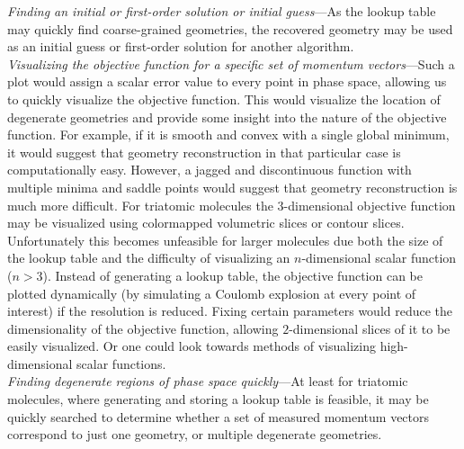 \emph{Finding an initial or first-order solution or initial guess}---As the lookup table may quickly find coarse-grained geometries, the recovered geometry may be used as an initial guess or first-order solution for another algorithm. \\

\noindent
\emph{Visualizing the objective function for a specific set of momentum vectors}---Such a plot would assign a scalar error value to every point in phase space, allowing us to quickly visualize the objective function. This would visualize the location of degenerate geometries and provide some insight into the nature of the objective function. For example, if it is smooth and convex with a single global minimum, it would suggest that geometry reconstruction in that particular case is computationally easy. However, a jagged and discontinuous function with multiple minima and saddle points would suggest that geometry reconstruction is much more difficult. For triatomic molecules the $3$-dimensional objective function may be visualized using colormapped volumetric slices or contour slices. Unfortunately this becomes unfeasible for larger molecules due both the size of the lookup table and the difficulty of visualizing an $n$-dimensional scalar function ($n>3$). Instead of generating a lookup table, the objective function can be plotted dynamically (by simulating a Coulomb explosion at every point of interest) if the resolution is reduced. Fixing certain parameters would reduce the dimensionality of the objective function, allowing $2$-dimensional slices of it to be easily visualized. Or one could look towards methods of visualizing high-dimensional scalar functions. \\

\noindent
\emph{Finding degenerate regions of phase space quickly}---At least for triatomic molecules, where generating and storing a lookup table is feasible, it may be quickly searched to determine whether a set of measured momentum vectors correspond to just one geometry, or multiple degenerate geometries. 